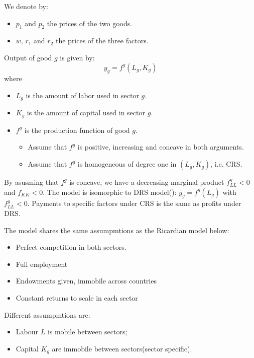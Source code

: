 We denote by:
\begin{itemize}
    \item $p_1$ and $p_2$ the prices of the two goods.
    \item $w$, $r_1$ and $r_2$ the prices of the three factors.
\end{itemize}
Output of good $g$ is given by:
\begin{equation*}
    y_g = f^g(L_g, K_g)
\end{equation*}
where
\begin{itemize}
    \item $L_g$ is the amount of labor used in sector $g$.
    \item $K_g$ is the amount of capital used in sector $g$.
    \item $f^g$ is the production function of good $g$.
        \begin{itemize}
            \item Assume that $f^g$ is positive, increasing and concave in both arguments.
            \item Assume that $f^g$ is homogeneous of degree one in $(L_g, K_g)$, i.e. CRS.
        \end{itemize}
\end{itemize}
By asusming that $f^g$ is concave, we have a decreasing marginal product $f_{LL}^g < 0$ and $f_{KK} < 0$.
The model is isomorphic to DRS model(\cite{dornbusch1977comparative}): $y_g = f^g(L_g)$ with $f_{LL}^g < 0$.
Payments to specific factors under CRS is the same as profits under DRS.

The model shares the same assumpmtions as the Ricardian model below:
\begin{itemize}
    \item Perfect competition in both sectors.
    \item Full employment
    \item Endowments given, immobile across countries
    \item Constant returns to scale in each sector
\end{itemize}
Different assumpmtions are:
\begin{itemize}
    \item Labour $L$ is mobile between sectors;
    \item Capital $K_g$ are immobile between sectors(sector specific).
\end{itemize}

